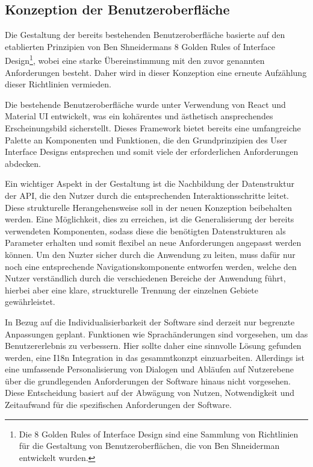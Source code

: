 \subsection{Konzeption der Benutzeroberfläche}
Die Gestaltung der bereits bestehenden Benutzeroberfläche basierte auf den etablierten Prinzipien von Ben Shneidermans 8 Golden Rules of Interface 
Design\footnote{Die 8 Golden Rules of Interface Design sind eine Sammlung von Richtlinien für die Gestaltung von Benutzeroberflächen, die von Ben Shneiderman entwickelt wurden.}, wobei eine starke Übereinstimmung mit den zuvor genannten Anforderungen besteht. 
Daher wird in dieser Konzeption eine erneute Aufzählung dieser Richtlinien vermieden.

Die bestehende Benutzeroberfläche wurde unter Verwendung von React und Material UI entwickelt, was ein kohärentes und ästhetisch ansprechendes Erscheinungsbild sicherstellt. 
Dieses Framework bietet bereits eine umfangreiche Palette an Komponenten und Funktionen, die den Grundprinzipien des User Interface Designs entsprechen und somit viele der erforderlichen Anforderungen abdecken.

Ein wichtiger Aspekt in der Gestaltung ist die Nachbildung der Datenstruktur der \ac{API}, die den Nutzer durch die entsprechenden Interaktionsschritte leitet. Diese strukturelle Herangehensweise soll in der neuen Konzeption beibehalten werden. 
Eine Möglichkeit, dies zu erreichen, ist die Generalisierung der bereits verwendeten Komponenten, sodass diese die benötigten Datenstrukturen als Parameter erhalten und somit flexibel an neue Anforderungen angepasst werden können.
Um den Nuzter sicher durch die Anwendung zu leiten, muss dafür nur noch eine entsprechende Navigationskomponente entworfen werden, welche den Nutzer verständlich durch die verschiedenen Bereiche der Anwendung führt, hierbei aber eine klare, struckturelle Trennung der einzelnen Gebiete gewährleistet.

In Bezug auf die Individualisierbarkeit der Software sind derzeit nur begrenzte Anpassungen geplant. Funktionen wie Sprachänderungen sind vorgesehen, um das Benutzererlebnis zu verbessern. Hier sollte daher eine sinnvolle Lösung gefunden werden, eine I18n Integration in das gesammtkonzpt einzuarbeiten.
Allerdings ist eine umfassende Personalisierung von Dialogen und Abläufen auf Nutzerebene über die grundlegenden Anforderungen der Software hinaus nicht vorgesehen. 
Diese Entscheidung basiert auf der Abwägung von Nutzen, Notwendigkeit und Zeitaufwand für die spezifischen Anforderungen der Software.


